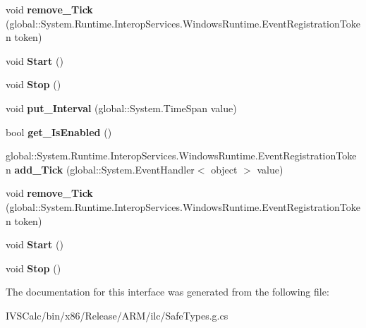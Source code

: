 \begin{DoxyCompactItemize}
void {\bfseries remove\+\_\+\+Tick} (global\+::\+System.\+Runtime.\+Interop\+Services.\+Windows\+Runtime.\+Event\+Registration\+Token token)
\item 
\mbox{\label{interface_windows_1_1_u_i_1_1_xaml_1_1_i_dispatcher_timer_a684008a3b69e0e2bdfff696ff246aff6}} 
void {\bfseries Start} ()
\item 
\mbox{\label{interface_windows_1_1_u_i_1_1_xaml_1_1_i_dispatcher_timer_ab54d6b697589bdb58c5d2ae6f4cfafcc}} 
void {\bfseries Stop} ()
\item 
\mbox{\label{interface_windows_1_1_u_i_1_1_xaml_1_1_i_dispatcher_timer_a31cd041ad06e9800dd7028428f45ffce}} 
void {\bfseries put\+\_\+\+Interval} (global\+::\+System.\+Time\+Span value)
\item 
\mbox{\label{interface_windows_1_1_u_i_1_1_xaml_1_1_i_dispatcher_timer_a67b6e2e9a009502e0c91978ec3e1ffc6}} 
bool {\bfseries get\+\_\+\+Is\+Enabled} ()
\item 
\mbox{\label{interface_windows_1_1_u_i_1_1_xaml_1_1_i_dispatcher_timer_a51cc49d4e074524b59fd3824af1b971f}} 
global\+::\+System.\+Runtime.\+Interop\+Services.\+Windows\+Runtime.\+Event\+Registration\+Token {\bfseries add\+\_\+\+Tick} (global\+::\+System.\+Event\+Handler$<$ object $>$ value)
\item 
\mbox{\label{interface_windows_1_1_u_i_1_1_xaml_1_1_i_dispatcher_timer_ad50c6aef1abbae667daedf72bb953263}} 
void {\bfseries remove\+\_\+\+Tick} (global\+::\+System.\+Runtime.\+Interop\+Services.\+Windows\+Runtime.\+Event\+Registration\+Token token)
\item 
\mbox{\label{interface_windows_1_1_u_i_1_1_xaml_1_1_i_dispatcher_timer_a684008a3b69e0e2bdfff696ff246aff6}} 
void {\bfseries Start} ()
\item 
\mbox{\label{interface_windows_1_1_u_i_1_1_xaml_1_1_i_dispatcher_timer_ab54d6b697589bdb58c5d2ae6f4cfafcc}} 
void {\bfseries Stop} ()
\end{DoxyCompactItemize}


The documentation for this interface was generated from the following file\+:\begin{DoxyCompactItemize}
\item 
I\+V\+S\+Calc/bin/x86/\+Release/\+A\+R\+M/ilc/Safe\+Types.\+g.\+cs\end{DoxyCompactItemize}
